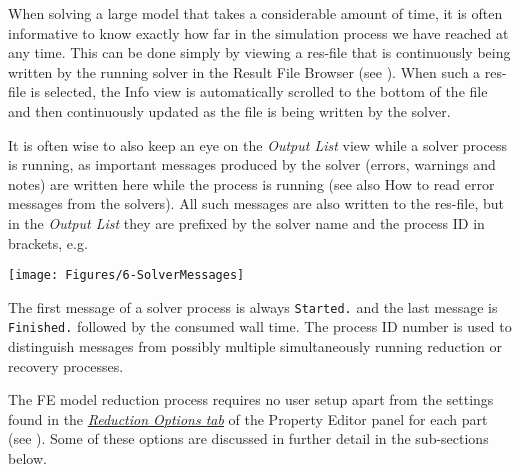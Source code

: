 
When solving a large model that takes a considerable amount of time, it
is often informative to know exactly how far in the simulation process
we have reached at any time. This can be done simply by viewing a
res-file that is continuously being written by the running solver in the
Result File Browser (see ).
When such a res-file is selected,
the Info view is automatically scrolled to the bottom of the file
and then continuously updated as the file is being written by the solver.


\clearpage
It is often wise to also keep an eye on the {\sl Output List} view
while a solver process is running, as important messages produced by the
solver (errors, warnings and notes) are written here while the process
is running (see also
           {How to read error messages from the solvers}).
All such messages are also written to the res-file, but in the {\sl Output List}
they are prefixed by the solver name and the process ID in brackets, e.g.

\vskip2mm\noindent{}\textwidth
\texttt{[image: Figures/6-SolverMessages]}

The first message of a solver process is always {\tt Started.}
and the last message is {\tt Finished.} followed by the consumed wall time.
The process ID number is used to distinguish messages from possibly multiple
simultaneously running reduction or recovery processes.



The FE model reduction process requires no user setup apart from the settings
found in the \protect\hyperlink{reduction-options-tab}
{\sl Reduction Options tab} of the Property Editor panel for each part
(see ).
Some of these options are discussed in further detail in the sub-sections below.


